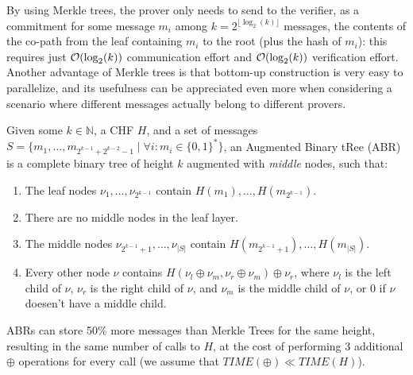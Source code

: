 \noindent By using Merkle trees, the prover only needs to send to the verifier, as a commitment for
some message \(m_i\) among \(k = 2^{\lfloor\log_2(k)\rfloor}\) messages, the contents of the
co-path from the leaf containing \(m_i\) to the root (plus the hash of \(m_i\)): this requires just
\(\mathcal{O}(\log_2(k))\) communication effort and \(\mathcal{O}(\log_2(k))\) verification effort.
Another advantage of Merkle trees is that bottom-up construction is very easy to parallelize,
and its usefulness can be appreciated even more when considering a scenario where different
messages actually belong to different provers.
\begin{definition}
	Given some \(k \in \mathbb{N}\), a CHF \(H\), and a set of messages
	\(S = \{m_1, \dots, m_{2^{k-1} + 2^{k-2}-1} \mid \forall i\colon m_i \in {\{0, 1\}}^*\} \),
	an Augmented Binary tRee (ABR) is a complete binary tree of
	height \(k\) augmented with \emph{middle} nodes, such that:
	\begin{enumerate}
		\item The leaf nodes \(\nu_{1}, \dots, \nu_{2^{k-1}}\) contain \(H(m_1), \dots,
		      H(m_{2^{k-1}})\).
		\item There are no middle nodes in the leaf layer.
		\item The middle nodes \(\nu_{2^{k-1}+1}, \dots, \nu_{|S|}\) contain
		      \(H(m_{2^{k-1}+1}), \dots, H(m_{|S|})\).
		\item Every other node \(\nu \) contains \(H(\nu_l \oplus \nu_m, \nu_r \oplus \nu_m)
		      \oplus \nu_r \), where \(\nu_l\) is the left child of \(\nu \), \(\nu_r\) is the right
		      child of \(\nu \), and \(\nu_m\) is the middle child of \(\nu \), or
		      \(0\) if \(\nu \) doesen't have a middle child.
	\end{enumerate}
\end{definition}

\noindent ABRs can store 50\% more messages than Merkle Trees for the same height, resulting in the
same number of calls to \(H\), at the cost of performing 3 additional \(\oplus \) operations for
every call (we assume that \(TIME(\oplus) \ll TIME(H)\)).
